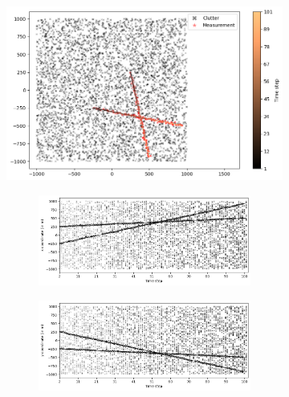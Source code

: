 \begin{figure}
    \centering
    \begin{subfigure}[]{0.48\linewidth}
        \centering
        \includegraphics[width=\linewidth]{figures/c1-tracks-measurements.png}
    \end{subfigure}
    \hfill
    \begin{subfigure}[]{0.48\linewidth}
        \centering
        \begin{subfigure}[t]{\linewidth}
            \includegraphics[width=\linewidth]{figures/c1-x-estimates.png}
        \end{subfigure}
        \vfill\par
        \begin{subfigure}[b]{\linewidth}
            \includegraphics[width=\linewidth]{figures/c1-y-estimates.png}

\end{subfigure}
\end{subfigure}
\end{figure}
